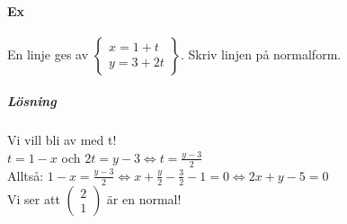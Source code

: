 \paragraph{Ex} En linje ges av $\left\lbrace\begin{matrix}
    x=1+t\\y=3+2t
\end{matrix}\right\rbrace$.
Skriv linjen på normalform.
\subparagraph{Lösning} Vi vill bli av med t!\\
$t=1-x$ och $2t=y-3\Leftrightarrow t=\frac{y-3}{2}$\\
Alltså: $1-x=\frac{y-3}{2}\Leftrightarrow x+\frac{y}{2}-\frac{3}{2}-1=0\Leftrightarrow 2x+y-5=0$\\
Vi ser att $\begin{pmatrix}2\\1\end{pmatrix}$ är en normal!

